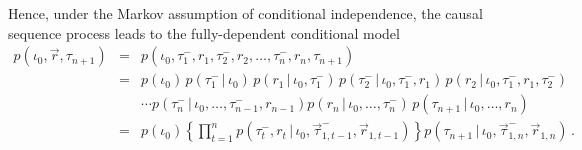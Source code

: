 \documentclass[a4paper]{article}
\newcommand{\vr}{\vec{r}}
\newcommand{\tm}{\tau^{-}}
\begin{document}
Hence, under the Markov assumption of conditional independence,
the causal sequence process leads to the fully-dependent conditional model
\begin{eqnarray}
p(\iota_0,\vr,\tau_{n+1}) & = &
p(\iota_0,\tm_1,r_1,\tm_2,r_2,\ldots,\tm_n,r_n,\tau_{n+1})
\nonumber\\
& = &
p(\iota_0)
\,p(\tm_1\,|\,\iota_0)
\,p(r_1\,|\,\iota_0,\tm_1)
\,p(\tm_2\,|\,\iota_0,\tm_1,r_1)
\, p(r_2\,|\,\iota_0,\tm_1,r_1,\tm_2)
\nonumber\\
&&
\cdots
p(\tm_n\,|\,\iota_0,\ldots,\tm_{n-1},r_{n-1})
p(r_n\,|\,\iota_0,\ldots,\tm_{n})
\, p(\tau_{n+1}\,|\,\iota_0,\ldots,r_n)
\nonumber\\
& = &
p(\iota_0)
\left\{\prod_{t=1}^{n}p(\tm_t,r_t\,|\,\iota_0,\vec{\tau}^-_{1,t-1},\vr_{1,t-1})\right\}
 p(\tau_{n+1}\,|\,\iota_0,\vec{\tau}^-_{1,n},\vr_{1,n})
\,.
\label{eq:temporal-model-full}
\end{eqnarray}
\end{document}
